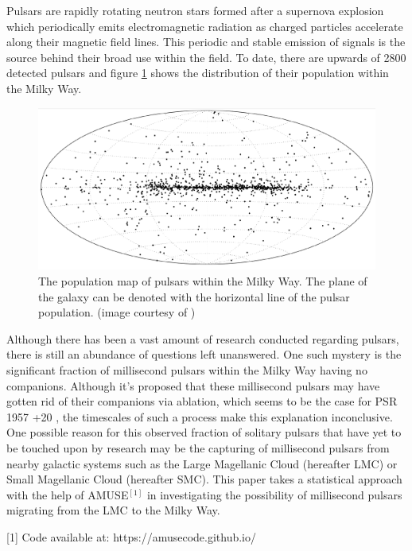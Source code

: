 Pulsars are rapidly rotating neutron stars formed after a supernova explosion which periodically emits electromagnetic radiation as charged particles accelerate along their magnetic field lines. This periodic and stable emission of signals is the source behind their broad use within the field. To date, there are upwards of 2800 detected pulsars \citep{AustraliaPulsar} and figure \ref{PulsarPopMap} shows the distribution of their population within the Milky Way.

\begin{figure}[htbp]
\centering
\includegraphics[scale=0.45]{Pulsars.pdf}
\caption{The population map of pulsars within the Milky Way. The plane of the galaxy can be denoted with the horizontal line of the pulsar population. (image courtesy of \cite{Lorimer2001})}
\label{PulsarPopMap}
\end{figure}

Although there has been a vast amount of research conducted regarding pulsars, there is still an abundance of questions left unanswered. One such mystery is the significant fraction of millisecond pulsars within the Milky Way having no companions. Although it's proposed that these millisecond pulsars may have gotten rid of their companions via ablation, which seems to be the case for PSR 1957 +20 \citep{Ablation}, the timescales of such a process make this explanation inconclusive. One possible reason for this observed fraction of solitary pulsars that have yet to be touched upon by research may be the capturing of millisecond pulsars from nearby galactic systems such as the Large Magellanic Cloud (hereafter LMC) or Small Magellanic Cloud (hereafter SMC). This paper takes a statistical approach with the help of AMUSE$^{[1]}$ \citep{AMUSE} in investigating the possibility of millisecond pulsars migrating from the LMC to the Milky Way.

\vfill
{\tiny [1] Code available at: https://amusecode.github.io/}

